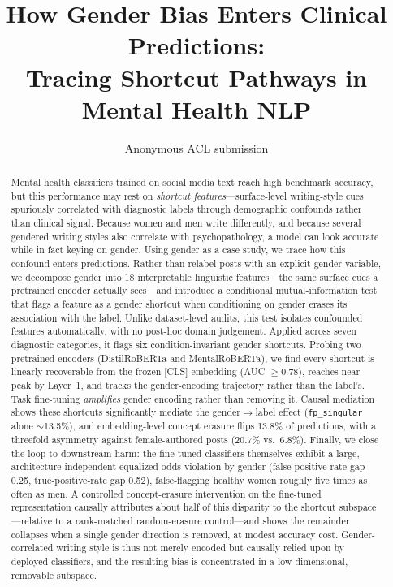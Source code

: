 \documentclass[11pt]{article}
\title{How Gender Bias Enters Clinical Predictions:\\Tracing Shortcut Pathways in Mental Health NLP}
\author{Anonymous ACL submission}
\begin{document}
\maketitle

\begin{abstract}
Mental health classifiers trained on social media text reach high benchmark accuracy, but this performance may rest on \textit{shortcut features}---surface-level writing-style cues spuriously correlated with diagnostic labels through demographic confounds rather than clinical signal. Because women and men write differently, and because several gendered writing styles also correlate with psychopathology, a model can look accurate while in fact keying on gender. Using gender as a case study, we trace how this confound enters predictions. Rather than relabel posts with an explicit gender variable, we decompose gender into 18 interpretable linguistic features---the same surface cues a pretrained encoder actually sees---and introduce a conditional mutual-information test that flags a feature as a gender shortcut when conditioning on gender erases its association with the label. Unlike dataset-level audits, this test isolates confounded features automatically, with no post-hoc domain judgement. Applied across seven diagnostic categories, it flags six condition-invariant gender shortcuts. Probing two pretrained encoders (DistilRoBERTa and MentalRoBERTa), we find every shortcut is linearly recoverable from the frozen [CLS] embedding (AUC $\geq 0.78$), reaches near-peak by Layer~1, and tracks the gender-encoding trajectory rather than the label's. Task fine-tuning \emph{amplifies} gender encoding rather than removing it. Causal mediation shows these shortcuts significantly mediate the gender$\to$label effect (\texttt{fp\_singular} alone $\sim$13.5\%), and embedding-level concept erasure flips 13.8\% of predictions, with a threefold asymmetry against female-authored posts (20.7\% vs.\ 6.8\%). Finally, we close the loop to downstream harm: the fine-tuned classifiers themselves exhibit a large, architecture-independent equalized-odds violation by gender (false-positive-rate gap 0.25, true-positive-rate gap 0.52), false-flagging healthy women roughly five times as often as men. A controlled concept-erasure intervention on the fine-tuned representation causally attributes about half of this disparity to the shortcut subspace---relative to a rank-matched random-erasure control---and shows the remainder collapses when a single gender direction is removed, at modest accuracy cost. Gender-correlated writing style is thus not merely encoded but causally relied upon by deployed classifiers, and the resulting bias is concentrated in a low-dimensional, removable subspace.
\end{abstract}
\end{document}
